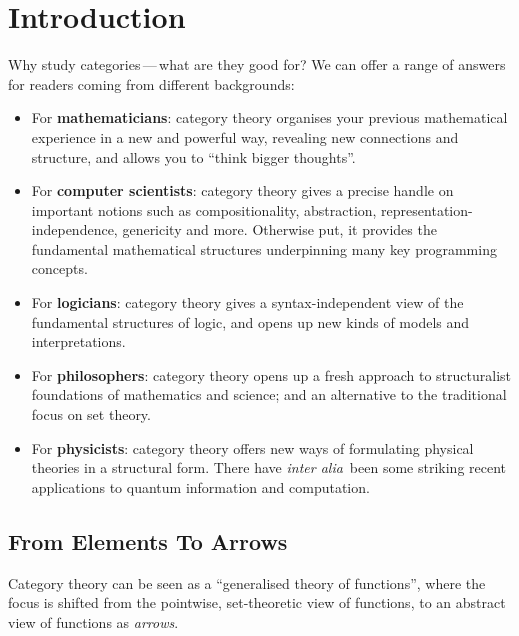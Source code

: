 \documentclass[12pt]{article}
\begin{document}
\section{Introduction}
Why study categories\,---\,what are they good for? We can offer a range of answers for readers coming from different backgrounds:
\begin{itemize}
\item For \textbf{mathematicians}: category theory organises your previous mathematical experience in a new and powerful way, revealing new connections and structure,
and allows you to ``think bigger thoughts''.
\item For  \textbf{computer scientists}: category theory gives a precise handle on important notions such as compositionality, abstraction, represen{\-}tation-independence, genericity and more.
Otherwise put, it provides the fundamental mathematical structures underpinning many key programming concepts.
\item For  \textbf{logicians}: category theory gives a syntax-independent view of the fundamental structures of logic, and opens up new kinds of models and interpretations.
\item For  \textbf{philosophers}: category theory opens up a fresh approach to structuralist foundations of mathematics and science; and an alternative to the traditional focus
on set theory.
\item For \textbf{physicists}: category theory offers new ways of formulating physical theories in a structural form. There have \textit{inter alia}~been some striking recent applications to quantum information and
computation.
\end{itemize}


\subsection{From Elements To Arrows}
%
Category theory can be seen as a ``generalised theory of functions'',  where the focus is shifted from the pointwise, set-theoretic view of functions,
to an abstract view of functions as \emph{arrows}.
\end{document}
